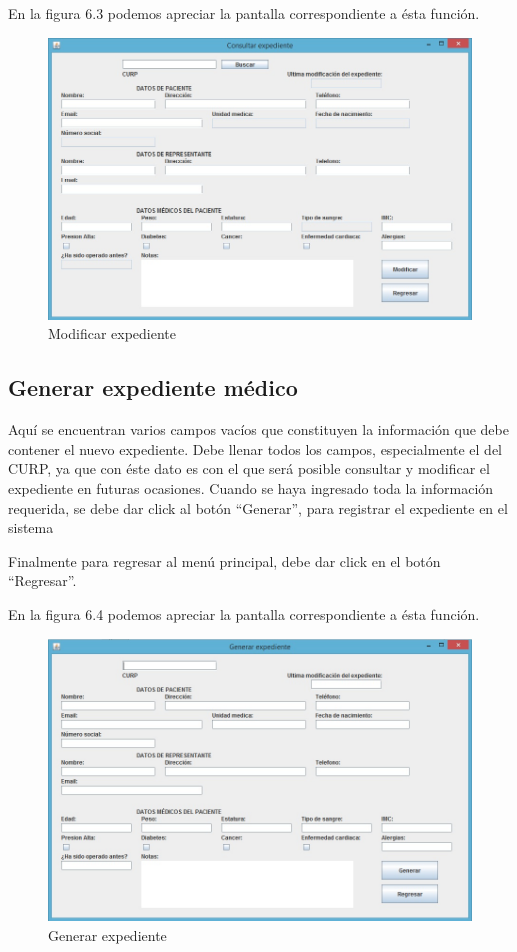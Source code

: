 En la figura 6.3 podemos apreciar la pantalla correspondiente a \'esta funci\'on.

\begin{figure}[htbp!]
		\centering		
	\end{figure}
\begin{figure}[htbp!]
\centering
		\includegraphics[width=.8\textwidth]{images/gui/IUModificaExp}
		\caption{Modificar expediente}
\end{figure}


\subsection{Generar expediente m\'edico}

Aqu\'i se encuentran varios campos vac\'ios que constituyen la informaci\'on que debe contener el nuevo expediente. Debe llenar todos los campos, especialmente el del CURP, ya que con \'este dato es con el que ser\'a posible consultar y modificar el expediente en futuras ocasiones.
Cuando se haya ingresado toda la informaci\'on requerida, se debe dar click al bot\'on  "`Generar"', para registrar el expediente en el sistema

Finalmente para regresar al men\'u principal, debe dar click en el bot\'on "`Regresar"'.

En la figura 6.4 podemos apreciar la pantalla correspondiente a \'esta funci\'on.

\begin{figure}[htbp!]
		\centering		
	\end{figure}
\begin{figure}[htbp!]
\centering
		\includegraphics[width=.9\textwidth]{images/gui/IUGeneraExp}
		\caption{Generar expediente}
\end{figure}

